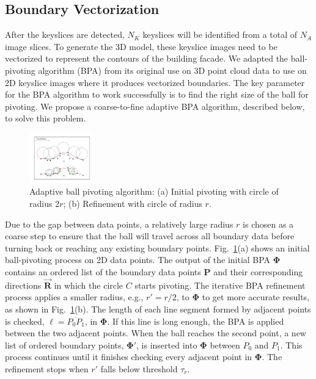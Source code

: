 \documentclass{article}
\newcommand{\Figa}[1]{Fig.~\ref{fig:#1}(a)}
\newcommand{\Figb}[1]{Fig.~\ref{fig:#1}(b)}
\begin{document}
\subsection{Boundary Vectorization}
\label{ssec:BPA}

After the keyslices are detected, $N_K$ keyslices will be identified
from a total of $N_A$ image slices.
To generate the 3D model, these keyslice images need to be vectorized to
represent the contours of the building facade.
We adapted the ball-pivoting algorithm (BPA)
\cite{BPA_BMRS} from its original use on 3D point cloud data to use on
2D keyslice images where it produces vectorized boundaries.
The key parameter for the BPA algorithm to work successfully is to
find the right size of the ball for pivoting.
We propose a coarse-to-fine adaptive BPA algorithm, described below,
to solve this problem.

\begin{figure}[hbtp]
\centering
\includegraphics[width=0.25\textwidth]{figures/BPA.pdf}
\caption{Adaptive ball pivoting algorithm:
(a) Initial pivoting with circle of radius 2$r$;
(b) Refinement with circle of radius $r$.}
\label{fig:BPA}
\end{figure}

Due to the gap between data points, a relatively large radius $r$ is chosen
as a coarse step to ensure that the ball will travel across all boundary
data before turning back or reaching any existing boundary points.
\Figa{BPA} shows an initial ball-pivoting process on 2D data points.
The output of the initial BPA $\boldsymbol{\Phi}$ contains an ordered list of the boundary data
points $\boldsymbol{P}$ and their corresponding directions $\overrightarrow{\boldsymbol{R}}$ in which
the circle $C$ starts pivoting.
The iterative BPA refinement process applies a smaller radius, e.g., $r' = r/2$,
to $\boldsymbol{\Phi}$ to get more accurate results, as shown in \Figb{BPA}.
The length of each line segment formed by adjacent points is checked,
$\ell = \overline{P_0P_1}$, in $\boldsymbol{\Phi}$.
If this line is long enough, the BPA is applied between the two adjacent points.
When the ball reaches the second point, a new list of ordered boundary points,
$\boldsymbol{\Phi'}$, is inserted into $\boldsymbol{\Phi}$ between $P_0$ and
$P_1$.
This process continues until it finishes checking every adjacent point in $\boldsymbol{\Phi}$.
The refinement stops when $r'$ falls below threshold $\tau_r$.
 
\end{document}
